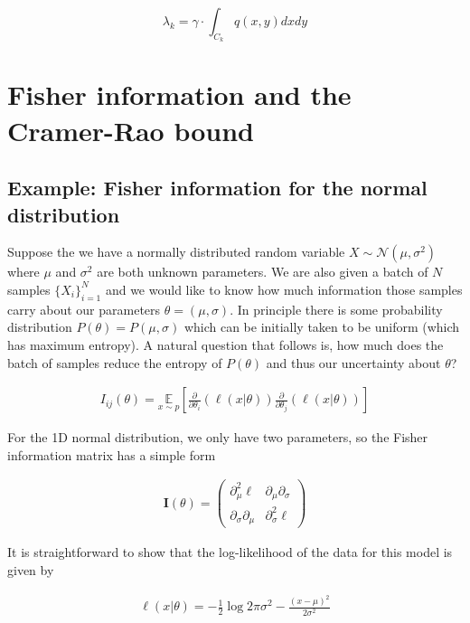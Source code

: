 \documentclass{article}
\begin{document}
\begin{equation*}
\lambda_{k} = \gamma\cdot\int_{C_{k}} q(x,y)dxdy
\end{equation*}

\section{Fisher information and the Cramer-Rao bound}

\subsection{Example: Fisher information for the normal distribution}

Suppose the we have a normally distributed random variable $X \sim \mathcal{N}(\mu,\sigma^{2})$ where $\mu$ and $\sigma^{2}$ are both unknown parameters. We are also given a batch of $N$ samples $\{X_{i}\}_{i=1}^{N}$ and we would like to know how much information those samples carry about our parameters $\theta = (\mu,\sigma)$. In principle there is some probability distribution $P(\theta)=P(\mu,\sigma)$ which can be initially taken to be uniform (which has maximum entropy). A natural question that follows is, how much does the batch of samples reduce the entropy of $P(\theta)$ and thus our uncertainty about $\theta$?

\begin{align*}
I_{ij}(\theta) = \underset{{x\sim p}}{\mathbb{E}}\left[\frac{\partial}{\partial\theta_{i}} \left(\ell(x|\theta)\right)\frac{\partial}{\partial\theta_{j}} \left(\ell(x|\theta)\right)\right]
\end{align*}

For the 1D normal distribution, we only have two parameters, so the Fisher information matrix has a simple form 

\begin{align*}
\mathbf{I}(\theta) = \begin{pmatrix}
\partial_{\mu}^{2}\ell & \partial_{\mu}\partial_{\sigma} \\
\partial_{\sigma}\partial_{\mu} & \partial_{\sigma}^{2}\ell
\end{pmatrix}
\end{align*}

It is straightforward to show that the log-likelihood of the data for this model is given by

\begin{align*}
\ell(x|\theta) = -\frac{1}{2}\log 2\pi\sigma^{2} - \frac{(x-\mu)^{2}}{2\sigma^{2}}
\end{align*}
\end{document}
